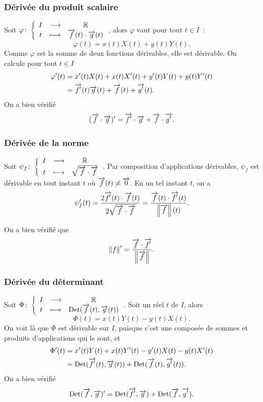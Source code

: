 \subsubsection{Dérivée du produit scalaire}

Soit \(\varphi\colon\left\{\begin{array}{ccc}I & \longrightarrow &\mathbb{R}\\t & \longmapsto & \overrightarrow{f}(t) \cdot \overrightarrow{g}(t)\end{array}\right.\), alors 
\(\varphi\) vaut pour tout \(t \in I\)~:
\begin{equation}
  \varphi(t)=x(t)X(t)+y(t)Y(t).
\end{equation}
Comme \(\varphi\) est la somme de deux fonctions dérivables, elle est dérivable.  
On calcule pour tout \(t \in I\)
\begin{align}
  \varphi'(t)&=x'(t)X(t) + x(t)X'(t) + y'(t)Y(t) + y(t)Y'(t)\\
             &=\overrightarrow{f'}(t)\overrightarrow{g}(t)+ \overrightarrow{f}(t) + \overrightarrow{g'}(t).
\end{align}
On a bien vérifié
\begin{equation}
  (\overrightarrow{f} \cdot \overrightarrow{g})'=\overrightarrow{f'} \cdot \overrightarrow{g} + \overrightarrow{f} \cdot 
  \overrightarrow{g'}.
\end{equation}

\subsubsection{Dérivée de la norme}

Soit \(\psi_f\colon\left\{\begin{array}{ccc}I & \longrightarrow &\mathbb{R}\\t & \longmapsto & \sqrt{\overrightarrow{f} \cdot \overrightarrow{f}}\end{array}\right.\). Par 
composition d'applications dérivables, \(\psi_f\) est dérivable en tout instant 
\(t\) où \(\overrightarrow{f}(t) \neq \overrightarrow{0}\). En un tel instant \(t\), on a
\begin{equation}
  \psi_f'(t)=\frac{2 \overrightarrow{f'}(t)\cdot\overrightarrow{f}(t)}{2 \sqrt{\overrightarrow{f} \cdot 
  \overrightarrow{f}}}=\frac{\overrightarrow{f}(t)\cdot\overrightarrow{f'}(t)}{\left\lVert\overrightarrow{f}\right\rVert(t)}.
\end{equation}

On a bien vérifié que
\begin{equation}
  \left\lVert f\right\rVert'=\frac{\overrightarrow{f} \cdot \overrightarrow{f'}}{\left\lVert\overrightarrow{f}\right\rVert}.
\end{equation}

\subsubsection{Dérivée du déterminant}

Soit \(\Phi\colon\left\{\begin{array}{ccc}I & \longrightarrow &\mathbb{R}\\t & \longmapsto & \operatorname{Det}(\overrightarrow{f}(t),\overrightarrow{g}(t))\end{array}\right.\). Soit un réel 
\(t\) de \(I\), alors
\begin{equation}
  \Phi(t) = x(t)Y(t) - y(t)X(t).
\end{equation}
On voit là que \(\Phi\) est dérivable sur \(I\), puisque c'est une composée de 
sommes et produits d'applications qui le sont, et
\begin{align}
  \Phi'(t)&=x'(t)Y(t) + x(t)Y'(t) - y'(t)X(t) - y(t)X'(t)\\
          &= \operatorname{Det}(\overrightarrow{f'}(t),\overrightarrow{g}(t)) + \operatorname{Det}(\overrightarrow{f}(t),\overrightarrow{g'}(t)).
\end{align}
On a bien vérifié
\begin{equation}
  \operatorname{Det}(\overrightarrow{f},\overrightarrow{g})' = \operatorname{Det}(\overrightarrow{f'},\overrightarrow{g}) + 
  \operatorname{Det}(\overrightarrow{f},\overrightarrow{g'}).
\end{equation}

